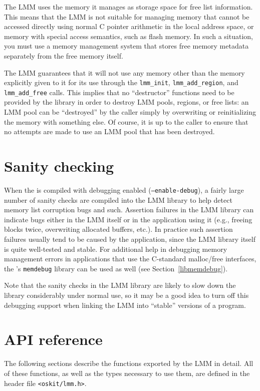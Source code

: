 The LMM uses the memory it manages
as storage space for free list information.
This means that the LMM is not suitable
for managing memory that cannot be accessed directly
using normal C pointer arithmetic in the local address space,
or memory with special access semantics, such as flash memory.
In such a situation, you must use a memory management system
that stores free memory metadata separately from the free memory itself.

The LMM guarantees that it will not use any memory
other than the memory explicitly given to it for its use
through the {\tt lmm_init}, {\tt lmm_add_region}, and {\tt lmm_add_free} calls.
This implies that no ``destructor'' functions need to be provided by the library
in order to destroy LMM pools, regions, or free lists:
an LMM pool can be ``destroyed'' by the caller
simply by overwriting or reinitializing the memory with something else.
Of course, it is up to the caller to ensure
that no attempts are made to use an LMM pool that has been destroyed.

\section{Sanity checking}

When the \oskit{} is compiled with debugging enabled ({\tt --enable-debug}),
a fairly large number of sanity checks are compiled into the LMM library
to help detect memory list corruption bugs and such.
Assertion failures in the LMM library can indicate bugs
either in the LMM itself or in the application using it
(e.g., freeing blocks twice, overwriting allocated buffers, etc.).
In practice such assertion failures
usually tend to be caused by the application,
since the LMM library itself is quite well-tested and stable.
For additional help in debugging memory management errors
in applications that use the C-standard malloc/free interfaces,
the \oskit{}'s {\tt memdebug} library can be used as well
(see Section~\ref{libmemdebug}).

Note that the sanity checks in the LMM library
are likely to slow down the library considerably under normal use,
so it may be a good idea to turn off this debugging support
when linking the LMM into ``stable'' versions of a program.


\section{API reference}

The following sections describe the functions exported by the LMM in detail.
All of these functions, as well as the types necessary to use them,
are defined in the header file {\tt <oskit/lmm.h>}.

